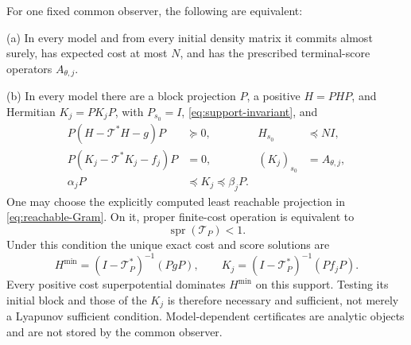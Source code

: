 \begin{theorem}\label{thm:memory-certificate}
For one fixed common observer, the following are equivalent:

\textup{(a)} In every model and from every initial density matrix it commits almost surely, has expected cost at most $N$, and has the prescribed terminal-score operators $A_{\theta,j}$.

\textup{(b)} In every model there are a block projection $P$, a positive $H=PHP$, and Hermitian $K_j=PK_jP$, with $P_{s_0}=I$, \eqref{eq:support-invariant}, and
\begin{align}
 P(H-\mathcal T^*H-g)P&\succeq0,& H_{s_0}&\preccurlyeq NI,\label{eq:memory-cost-cert}\\
 P(K_j-\mathcal T^*K_j-f_j)P&=0,& (K_j)_{s_0}&=A_{\theta,j},\label{eq:memory-score-cert}\\
 \alpha_jP&\preccurlyeq K_j\preccurlyeq\beta_jP.\label{eq:memory-K-bounds}
\end{align}
One may choose the explicitly computed least reachable projection in \eqref{eq:reachable-Gram}. On it, proper finite-cost operation is equivalent to
\begin{equation}\label{eq:memory-spectral}
 \operatorname{spr}(\mathcal T_P)<1.
\end{equation}
Under this condition the unique exact cost and score solutions are
\begin{equation}\label{eq:memory-resolvents}
 H^{\min}=(I-\mathcal T_P^*)^{-1}(PgP),\qquad
 K_j=(I-\mathcal T_P^*)^{-1}(Pf_jP).
\end{equation}
Every positive cost superpotential dominates $H^{\min}$ on this support. Testing its initial block and those of the $K_j$ is therefore necessary and sufficient, not merely a Lyapunov sufficient condition. Model-dependent certificates are analytic objects and are not stored by the common observer.
\end{theorem}
